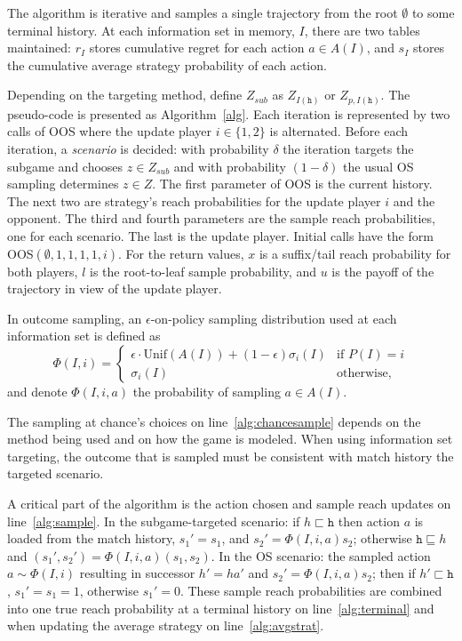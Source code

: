 \documentclass[letterpaper]{article}
\newcommand{\tth}{\mathtt{h}}
\begin{document}
The algorithm is iterative and samples a single trajectory from the root $\emptyset$ to some 
terminal history. At each information set in memory, $I$, there are two tables maintained: $r_I$ stores cumulative 
regret for each action $a \in A(I)$, and $s_I$ stores the cumulative average strategy probability of each 
action. 

Depending on the targeting method, define $Z_{sub}$ as $Z_{I(\tth)}$ or $Z_{p,I(\tth)}$. 
The pseudo-code is presented as Algorithm~\ref{alg}. 
Each iteration is represented by two calls of OOS where the update player $i \in \{1,2\}$ is alternated. 
Before each iteration, a {\it scenario} is decided: 
with probability $\delta$ the iteration targets the subgame and chooses $z \in Z_{sub}$
and with probability $(1-\delta)$ the usual OS sampling determines $z \in Z$. 
The first parameter of OOS is the current history. 
The next two are strategy's reach probabilities for the update player $i$ and the opponent. 
The third and fourth parameters are the sample reach probabilities, one for each scenario. 
The last is the update player. Initial calls have the form OOS$(\emptyset, 1, 1, 1, 1, i)$.  
For the return values, $x$ is a suffix/tail reach probability for both players, 
$l$ is the root-to-leaf sample probability, and $u$ is the payoff of the trajectory in view 
of the update player. 

In outcome sampling, an $\epsilon$-on-policy sampling distribution used at each information set
is defined as 
\begin{equation*}
\label{eq:ossample}
\Phi(I,i) = \left\{
\begin{array}{ll}
\epsilon \cdot \mbox{Unif}(A(I)) + (1-\epsilon)\sigma_i(I) & \mbox{if } P(I) = i\\ 
\sigma_i(I)                                          & \mbox{otherwise,}
\end{array} \right.
\end{equation*}
and denote $\Phi(I,i,a)$ the probability of sampling $a \in A(I)$. 

The sampling at chance's choices on line~\ref{alg:chancesample} depends on the method being 
used and on how the game is modeled. When using information set targeting, the outcome that is sampled 
must be consistent with match history the targeted scenario. 

A critical part of the algorithm is the action chosen and sample reach updates on line~\ref{alg:sample}. 
In the subgame-targeted scenario: if $h \sqsubset \tth$ then action $a$ is loaded from the match history, $s_1' = s_1$, 
and $s_2' = \Phi(I,i,a) s_2$; otherwise $\tth \sqsubseteq h$ and $(s_1', s_2') = \Phi(I,i,a) (s_1, s_2)$. 
In the OS scenario: the sampled action $a \sim \Phi(I,i)$ resulting in successor $h' = ha'$ and $s_2' = \Phi(I,i,a) s_2$; 
then if $h' \sqsubset \tth$, $s_1' = s_1 = 1$, otherwise $s_1' = 0$. These sample reach probabilities are combined into 
one true reach probability at a terminal history on line~\ref{alg:terminal} and when updating the average 
strategy on line~\ref{alg:avgstrat}. 
\end{document}

